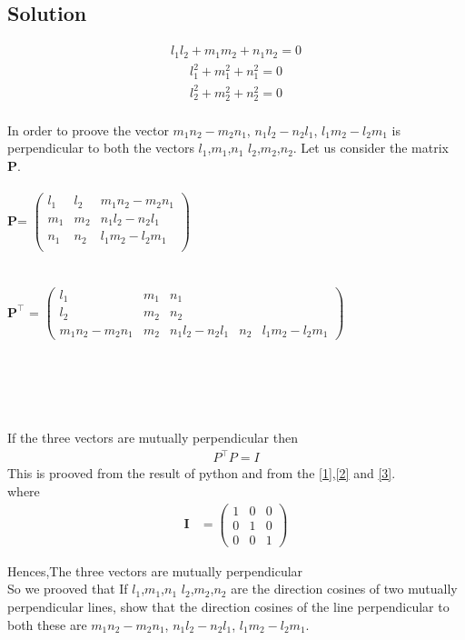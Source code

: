 \documentclass[12pt]{article}
\newcommand{\myvec}[1]{\ensuremath{\begin{pmatrix}#1\end{pmatrix}}}
\let\vec\mathbf
\begin{document}
\begin{enumerate}
\section{Solution}
\begin{align}
 l_1l_2+m_1m_2+n_1n_2=0\label{1}
 \end{align}
 \begin{align}
 l_1^2+m_1^2+n_1^2=0\label{2}
  \end{align}
  \begin{align}
  l_2^2+m_2^2+n_2^2=0\label{3}
  \end{align}
\\
In order to proove the vector  $m_1n_2-m_2n_1$, $n_1l_2-n_2l_1$, $l_1m_2-l_2m_1$ is perpendicular to both the vectors $l_1$,$m_1$,$n_1$  $l_2$,$m_2$,$n_2$. Let us consider the matrix \textbf{P}.
\\
\\
\textbf{P}=
	$\begin{pmatrix}
l_1&l_2&m_1n_2-m_2n_1\\
        m_1&m_2&n_1l_2-n_2l_1\\
        n_1&n_2&l_1m_2-l_2m_1\\
	\end{pmatrix}$
	\\
	\\	
	\\
	$\textbf{P}^{\top}$ =
	$\begin{pmatrix}
l_1&m_1&n_1\\
l_2&m_2&n_2\\
m_1n_2-m_2n_1&m_2&n_1l_2-n_2l_1&n_2&l_1m_2-l_2m_1
	\end{pmatrix}$ 
	\\
	\\
	\\
	\\
	\\
	\\
	If the three vectors are mutually perpendicular then
	\\
	\begin{align}
	P^{\top} P=I
	\end{align}
	This is prooved from the result of python and from the \eqref{1},\eqref{2} and \eqref{3}.\\
where 	
\begin{align}
\vec{I}&=
\myvec{
	         1&0&0\\
	          0&1&0\\
	           0&0&1
	           }
	\end{align}
	
	Hences,The three vectors are mutually perpendicular\\
	So we prooved that If $l_1$,$m_1$,$n_1$  $l_2$,$m_2$,$n_2$ are the direction cosines of two mutually perpendicular lines, show that the direction cosines of the line perpendicular to both these are  $m_1n_2-m_2n_1$, $n_1l_2-n_2l_1$, $l_1m_2-l_2m_1$.
	\\
	
	\noindent\fbox{%
    \parbox{\linewidth}{%
   	\url{https://github.com/srikanth9515/FWC/blob/main/matrices/lines/12.11.4.2/code/cosin.py}
    }%
}

\end{enumerate}							
\end{document}

